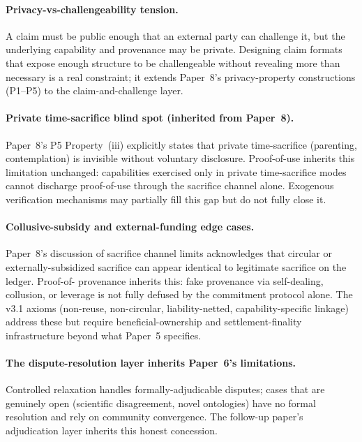 \documentclass{article}
\begin{document}
\paragraph{Privacy-vs-challengeability tension.}
A claim must be public enough that an external party can
challenge it, but the underlying capability and provenance may be
private.  Designing claim formats that expose enough structure
to be challengeable without revealing more than necessary is a
real constraint; it extends Paper~8's privacy-property
constructions (P1--P5) to the claim-and-challenge layer.

\paragraph{Private time-sacrifice blind spot (inherited from
Paper~8).}
Paper~8's P5 Property~(iii) explicitly states that private
time-sacrifice (parenting, contemplation) is invisible without
voluntary disclosure.  Proof-of-use inherits this limitation
unchanged: capabilities exercised only in private time-sacrifice
modes cannot discharge proof-of-use through the sacrifice
channel alone.  Exogenous verification mechanisms may partially
fill this gap but do not fully close it.

\paragraph{Collusive-subsidy and external-funding edge cases.}
Paper~8's discussion of sacrifice channel limits acknowledges
that circular or externally-subsidized sacrifice can appear
identical to legitimate sacrifice on the ledger.  Proof-of-
provenance inherits this: fake provenance via self-dealing,
collusion, or leverage is not fully defused by the commitment
protocol alone.  The v3.1 axioms (non-reuse, non-circular,
liability-netted, capability-specific linkage) address these but
require beneficial-ownership and settlement-finality
infrastructure beyond what Paper~5 specifies.

\paragraph{The dispute-resolution layer inherits Paper~6's
limitations.}
Controlled relaxation handles formally-adjudicable disputes;
cases that are genuinely open (scientific disagreement, novel
ontologies) have no formal resolution and rely on community
convergence.  The follow-up paper's adjudication layer inherits
this honest concession.
\end{document}
